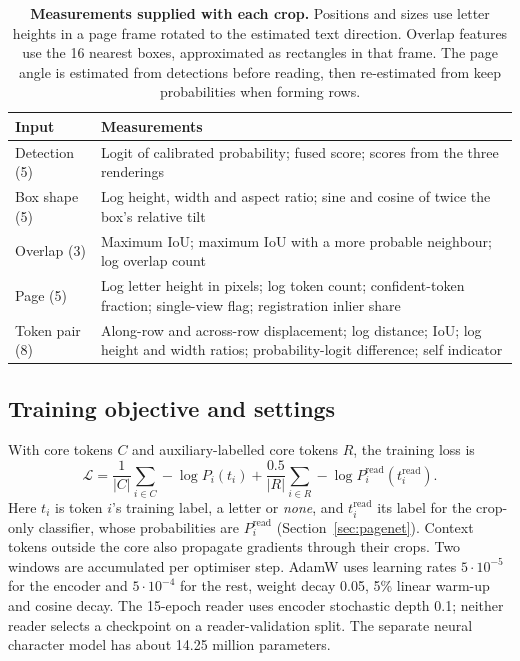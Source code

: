 \documentclass[11pt]{article}
\newcommand{\none}{\textit{none}}
\begin{document}
\begin{table}[htbp]
\centering\small
\begin{tabular}{@{}lp{}@{}}
\toprule
Input & Measurements \\
\midrule
Detection (5) & Logit of calibrated probability; fused score; scores from the three renderings \\
Box shape (5) & Log height, width and aspect ratio; sine and cosine of twice the box's relative tilt \\
Overlap (3) & Maximum IoU; maximum IoU with a more probable neighbour; log overlap count \\
Page (5) & Log letter height in pixels; log token count; confident-token fraction; single-view flag;
registration inlier share \\
Token pair (8) & Along-row and across-row displacement; log distance; IoU; log height and width ratios;
probability-logit difference; self indicator \\
\bottomrule
\end{tabular}
\caption{\textbf{Measurements supplied with each crop.} Positions and sizes use letter heights in a
page frame rotated to the estimated text direction. Overlap features use the 16 nearest boxes,
approximated as rectangles in that frame.
The page angle is estimated from detections before reading, then re-estimated from keep probabilities
when forming rows.}
\label{tab:features}
\end{table}

\subsection{Training objective and settings}
With core tokens $C$ and auxiliary-labelled core tokens $R$, the training loss is
\begin{equation}
 \mathcal L=\frac{1}{|C|}\sum_{i\in C}-\log P_i(t_i)
       +\frac{0.5}{|R|}\sum_{i\in R}-\log P_i^{\mathrm{read}}(t_i^{\mathrm{read}}).
 \label{eq:loss}
\end{equation}
Here $t_i$ is token $i$'s training label, a letter or \none{}, and $t_i^{\mathrm{read}}$ its label for the
crop-only classifier, whose probabilities are $P_i^{\mathrm{read}}$ (Section~\ref{sec:pagenet}).
Context tokens outside the core also propagate gradients through their crops. Two windows are
accumulated per optimiser step. AdamW uses learning rates $5\cdot10^{-5}$ for the encoder and
$5\cdot10^{-4}$ for the rest, weight decay 0.05, 5\% linear warm-up and cosine decay.
The 15-epoch reader uses encoder stochastic depth 0.1; neither reader selects a checkpoint on a
reader-validation split. The separate neural character model has about 14.25 million parameters.
\end{document}
